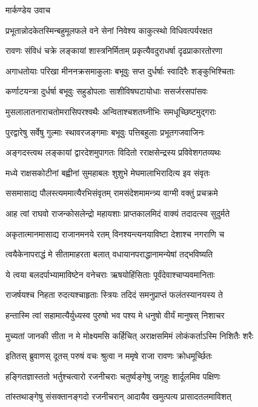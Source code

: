 \twolineshloka
{मार्कण्डेय उवाच}
{}


\twolineshloka
{प्रभूतान्नोदकेतस्मिन्बहुमूलफले वने}
{सेनां निवेश्य काकुत्स्थो विधिवत्पर्यरक्षत}


\twolineshloka
{रावणः संविधं चक्रे लङ्कायां शास्त्रनिर्मिताम्}
{प्रकृत्यैवदुराधर्षा दृढप्राकारतोरणा}


\twolineshloka
{अगाधतोयाः परिखा मीननक्रसमाकुलाः}
{बभूवुः सप्त दुर्धर्षाः स्वादिरैः शङ्कुभिश्चिताः}


\twolineshloka
{कर्णाटयन्त्रा दुर्धर्षा बभूवुः सहुडोपलाः}
{साशीविषघटायोधाः ससर्जरसपांसवः}


\twolineshloka
{मुसलालातनाराचतोमरासिपरश्वथैः}
{अन्विताश्चशतघ्नीभिः समधूच्छिष्टमुद्गराः}


\twolineshloka
{पुरद्वारेषु सर्वेषु गुल्माः स्थावरजङ्गमाः}
{बभूवुः पत्तिबहुलाः प्रभूतगजवाजिनः}


\twolineshloka
{अङ्गदस्त्वथ लङ्कायां द्वारदेशमुपागतः}
{विदितो रराक्षसेन्द्रस्य प्रविवेशगतव्यथः}


\twolineshloka
{मध्ये राक्षसकोटीनां बह्वीनां सुमहाबलः}
{शुशुभे मेघमालाभिरादित्य इव संवृतः}


\twolineshloka
{ससमासाद्य पौलस्त्यममात्यैरभिसंवृतम्}
{रामसंदेशमामन्त्र्य वाग्मी वक्तुं प्रचक्रमे}


\threelineshloka
{आह त्वां राघवो राजन्कोसलेन्द्रो महायशाः}
{प्राप्तकालमिदं वाक्यं तदादत्स्व सुदुर्मते}
{}


\twolineshloka
{अकृतात्मानमासाद्य राजानमनये रतम्}
{विनश्यन्त्यनयाविष्टा देशाश्च नगराणि च}


\twolineshloka
{त्वयैकेनापराद्धं मे सीतामाहरता बलात्}
{वधायानपराद्धानामन्येषां तद्भविष्यति}


\twolineshloka
{ये त्वया बलदर्पाभ्यामाविष्टेन वनेचराः}
{ऋषयोहिंसिताः पूर्वंदेवाश्चाप्यवमानिताः}


\twolineshloka
{राजर्षयश्च निहता रुदत्यश्चाहृताः स्त्रियः}
{तदिदं समनुप्राप्तं फलंतस्यानयस्य ते}


\twolineshloka
{हन्तास्मि त्वां सहामात्यैर्युध्यस्व पुरुषो भव}
{पश्य मे धनुषो वीर्यं मानुषस् निशाचर}


\twolineshloka
{मुच्यतां जानकी सीता न मे मोक्ष्यमसि कर्हिचित्}
{अराक्षसमिमं लोकंकर्ताऽस्मि निशितैः शरैः}


\twolineshloka
{इतितस् ब्रुवाणस् दूतस् परुषं वचः}
{श्रुत्वा न ममृषे राजा रावणः क्रोधमूर्च्छितः}


\twolineshloka
{हङ्गितज्ञास्ततो भर्तुश्चत्वारो रजनीचराः}
{चतुर्ष्वङ्गेषु जगृहुः शार्दूलमिव पक्षिणः}


\twolineshloka
{तांस्तथाङ्गेषु संसक्तानङ्गदो रजनीचरान्}
{आदायैव खमुत्पत्य प्रासादतलमाविशत्}


